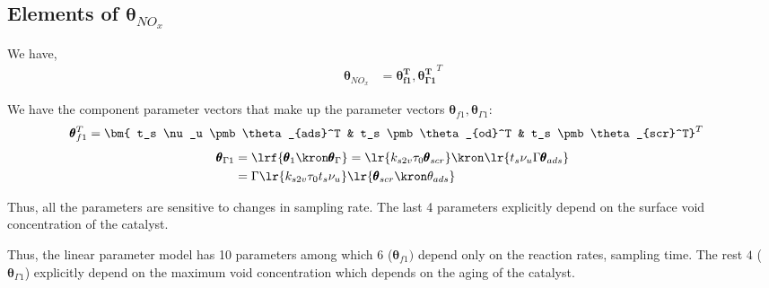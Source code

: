 \subsection{Elements of $\pmb \theta_{NO_x}$}

We have,
\begin{align*}
        \pmb \theta_{NO_x} &= \bm{\pmb \theta_{f1}^T, \pmb \theta_{\Gamma 1}^T}^T
\end{align*}

We have the component parameter vectors that make up the parameter vectors $\pmb \theta_{f1}, \pmb \theta_{\Gamma 1}$:
\begin{align*}
        \pmb \theta_{f1}^T &= \bm{ t_s \nu_u \pmb \theta_{ads}^T &
                                t_s \pmb \theta_{od}^T        &
                                t_s \pmb \theta_{scr}^T} ^T
\end{align*}
\begin{align*}
        \pmb \theta_{\Gamma 1} &= \lrf{\pmb \theta_1 \kron \pmb \theta_\Gamma}
                                = \lr{k_{s2v} \tau_0 \pmb \theta_{scr}} \kron \lr{t_s \nu_u \Gamma \pmb \theta_{ads}} \\
                               &= \Gamma \lr{k_{s2v} \tau_0 t_s \nu_u} \lr{\pmb \theta_{scr} \kron \theta_{ads}}
\end{align*}


Thus, all the parameters are sensitive to changes in sampling rate. The last 4 parameters explicitly depend on the surface void concentration of the catalyst.

Thus, the linear parameter model has 10 parameters among which $6$ ($\pmb \theta_{f1})$ depend only on the reaction rates, sampling time. The rest $4$ ($\pmb \theta_{\Gamma 1}$) explicitly depend on the maximum void concentration which depends on the aging of the catalyst.
